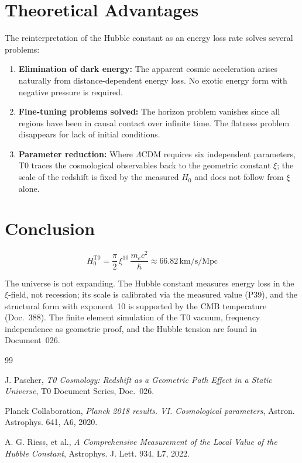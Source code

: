 \section{Theoretical Advantages}

	The reinterpretation of the Hubble constant as an energy loss rate solves several problems:

	\begin{enumerate}
		\item \textbf{Elimination of dark energy:} The apparent cosmic acceleration arises naturally from distance-dependent energy loss. No exotic energy form with negative pressure is required.

		\item \textbf{Fine-tuning problems solved:} The horizon problem vanishes since all regions have been in causal contact over infinite time. The flatness problem disappears for lack of initial conditions.

		\item \textbf{Parameter reduction:} Where $\Lambda$CDM requires six independent parameters, T0 traces the cosmological observables back to the geometric constant $\xi$; the scale of the redshift is fixed by the measured $H_0$ and does not follow from $\xi$ alone.
	\end{enumerate}

\section{Conclusion}

	\begin{equation}
		\boxed{H_0^{\text{T0}} = \frac{\pi}{2}\,\xi^{10}\,\frac{m_e c^2}{\hbar} \approx 66.82\,\text{km/s/Mpc}}
	\end{equation}

	The universe is not expanding. The Hubble constant measures energy loss in the $\xi$-field, not recession; its scale is calibrated via the measured value (P39), and the structural form with exponent~10 is supported by the CMB temperature (Doc.~388). The finite element simulation of the T0 vacuum, frequency independence as geometric proof, and the Hubble tension are found in Document~026.

	\begin{thebibliography}{99}

		J. Pascher, \textit{T0 Cosmology: Redshift as a Geometric Path Effect in a Static Universe}, T0 Document Series, Doc.~026.

		Planck Collaboration, \textit{Planck 2018 results. VI. Cosmological parameters}, Astron. Astrophys. 641, A6, 2020.

		A. G. Riess, et al., \textit{A Comprehensive Measurement of the Local Value of the Hubble Constant}, Astrophys. J. Lett. 934, L7, 2022.

	\end{thebibliography}
